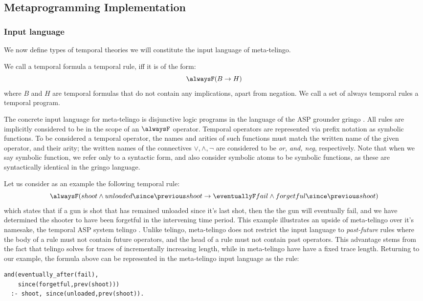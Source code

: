 \subsection{Metaprogramming Implementation}

\subsubsection{Input language}

We now define types of temporal theories we will constitute the input
language of meta-telingo.

\begin{definition}
  We call a temporal formula a temporal rule, iff it is of the form:
  $$
  \alwaysF(B \rightarrow H)
  $$
  where $B$ and $H$ are temporal formulas that do not contain any
  implications, apart from negation. We call a set of always temporal
  rules a temporal program.
\end{definition}

The concrete input language for meta-telingo is disjunctive logic
programs in the language of the ASP grounder gringo
\cite{PotasscoUserGuide19} \cite{gescth07a}. All rules are implicitly
considered to be in the scope of an $\alwaysF$ operator. Temporal
operators are represented via prefix notation as symbolic
functions. To be considered a temporal operator, the names and arities
of such functions must match the written name of the given operator,
and their arity; the written names of the connectives
$\vee, \wedge, \neg$ are considered to be \emph{or, and, neg},
respectively. Note that when we say symbolic function, we refer only
to a syntactic form, and also consider symbolic atoms to be symbolic
functions, as these are syntactically identical in the gringo
language.

Let us consider as an example the following temporal rule:
$$
\alwaysF(shoot \wedge unloaded \since \previous shoot \rightarrow \eventuallyF fail \wedge forgetful \since \previous shoot)
$$
which states that if a gun is shot that has remained unloaded since
it's last shot, then the the gun will eventually fail, and we have
determined the shooter to have been forgetful in the intervening time
period. This example illustrates an upside of meta-telingo over it's
namesake, the temporal ASP system telingo\cite{cakamosc19a}
\cite{agcadipescscvi20a}. Unlike telingo, meta-telingo does not
restrict the input language to \emph{past-future} rules
\cite{agcadipescscvi20a} where the body of a rule must not contain
future operators, and the head of a rule must not contain past
operators. This advantage stems from the fact that telingo solves for
traces of incrementally increasing length, while in meta-telingo have
have a fixed trace length. Returning to our example, the formula above
can be represented in the meta-telingo input language as the
rule:
\begin{center}
    \begin{lstlisting}[numbers=none]
and(eventually_after(fail),
    since(forgetful,prev(shoot))) 
  :- shoot, since(unloaded,prev(shoot)).
    \end{lstlisting}
\end{center}

